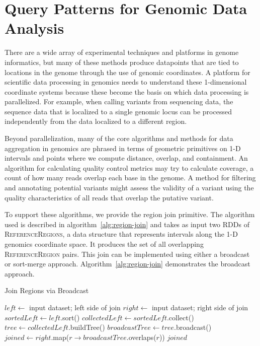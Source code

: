\documentclass[phd]{ucbthesis}
\begin{document}
\section{Query Patterns for Genomic Data Analysis}
\label{sec:query-patterns}

There are a wide array of experimental techniques and platforms in genome
informatics, but many of these methods produce datapoints that are tied to
locations in the genome through the use of genomic coordinates. A platform
for scientific data processing in genomics needs to understand these
1-dimensional coordinate systems because these become the basis on which
data processing is parallelized. For example, when calling variants from
sequencing data, the sequence data that is localized to a single genomic
locus can be processed independently from the data localized to a different
region.

Beyond parallelization, many of the core algorithms and methods for data
aggregation in genomics are phrased in terms of geometric primitives on 1-D
intervals and points where we compute distance, overlap, and containment. An
algorithm for calculating quality control metrics may try to calculate coverage,
a count of how many reads overlap each base in the genome. A method for
filtering and annotating potential variants might assess the validity of a
variant using the quality characteristics of all reads that overlap the
putative variant.

To support these algorithms, we provide the region join primitive. The algorithm
used is described in algorithm~\ref{alg:region-join} and takes as input two RDDs
of \textsc{ReferenceRegions}, a data structure that represents intervals along
the 1-D genomics coordinate space. It produces the set of all overlapping
\textsc{ReferenceRegion} pairs. This join can be implemented using either a
broadcast or sort-merge approach. Algorithm~\ref{alg:region-join} demonstrates
the broadcast approach.

\begin{algorithm}
\caption{Join Regions via Broadcast}
\label{alg:region-join}
\begin{algorithmic}
\STATE $left \leftarrow$ input dataset; left side of join
\STATE $right \leftarrow$ input dataset; right side of join
\STATE $sortedLeft \leftarrow left$.sort()
\STATE $collectedLeft \leftarrow sortedLeft$.collect()
\STATE $tree \leftarrow collectedLeft$.buildTree()
\STATE $broadcastTree \leftarrow tree$.broadcast()
\STATE $joined \leftarrow right$.map($r \rightarrow broadcastTree$.overlaps($r$))
\RETURN $joined$
\end{algorithmic}
\end{algorithm}
\end{document}
